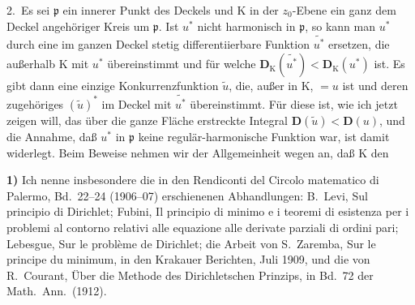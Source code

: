 \documentclass{article}
\begin{document}

2.\ Es sei $\mathfrak{p}$ ein innerer Punkt des Deckels und $\mathrm{K}$ in der $z_0$-Ebene ein ganz dem Deckel angehöriger Kreis um $\mathfrak{p}$. Ist $u^*$ nicht harmonisch in $\mathfrak{p}$, so kann man $u^*$ durch eine im ganzen Deckel stetig differentiierbare Funktion $\widetilde{u^*}$ ersetzen, die außerhalb $\mathrm{K}$ mit $u^*$ übereinstimmt und für welche $\mathbf{D}_{\mathrm{K}}(\widetilde{u^*}) < \mathbf{D}_{\mathrm{K}}(u^*)$ ist. Es gibt dann eine einzige Konkurrenzfunktion $\tilde{u}$, die, außer in $\mathrm{K}$, $= u$ ist und deren zugehöriges $(\tilde{u})^*$ im Deckel mit $\widetilde{u^*}$ übereinstimmt. Für diese ist, wie ich jetzt zeigen will, das über die ganze Fläche erstreckte Integral $\mathbf{D}(\tilde{u}) < \mathbf{D}(u)$, und die Annahme, daß $u^*$ in $\mathfrak{p}$ keine regulär-harmonische Funktion war, ist damit widerlegt. Beim Beweise nehmen wir der Allgemeinheit wegen an, daß $\mathrm{K}$ den

\textbf{1)} Ich nenne insbesondere die in den Rendiconti del Circolo matematico di Palermo, Bd.~22--24 (1906--07) erschienenen Abhandlungen: B.~Levi, Sul principio di Dirichlet; Fubini, Il principio di minimo e i teoremi di esistenza per i problemi al contorno relativi alle equazione alle derivate parziali di ordini pari; Lebesgue, Sur le problème de Dirichlet; die Arbeit von S.~Zaremba, Sur le principe du minimum, in den Krakauer Berichten, Juli 1909, und die von R.~Courant, Über die Methode des Dirichletschen Prinzips, in Bd.~72 der Math.\ Ann.\ (1912).
\end{document}
